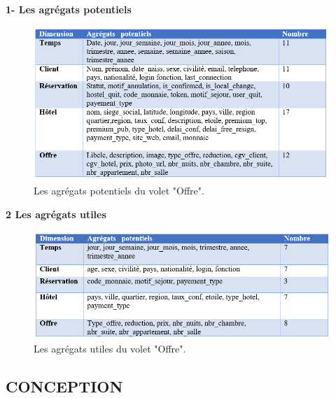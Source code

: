\textbf{1- Les agrégats potentiels}

\begin{figure}[!htbp]
	\begin{center}
		\includegraphics[scale=0.65]{images/tab_agregat_pot_offre.png}
		\caption{Les agrégats potentiels du volet "Offre".}
		\label{use_bi_tools}
	\end{center}
	\end{figure}
\cleardoublepage
\textbf{2	Les agrégats utiles}
\begin{figure}[!htbp]
	\begin{center}
		\includegraphics[scale=0.65]{images/tab_agregat_uti_offre.png}
		\caption{Les agrégats utiles du volet "Offre".}
		\label{use_bi_tools}
	\end{center}
	\end{figure}
	 
\subsection{CONCEPTION}







